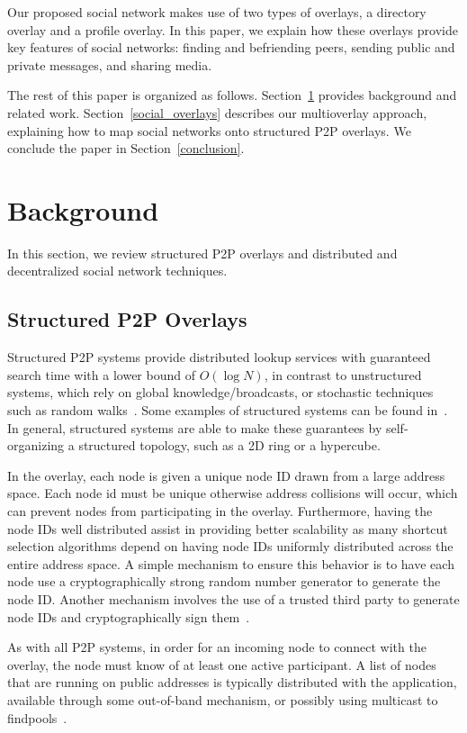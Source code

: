 \documentclass[letterpaper,twocolumn,10pt]{article}
\begin{document}
Our proposed social network makes use of two types of overlays, a directory
overlay and a profile overlay.  In this paper, we explain how these overlays
provide key features of social networks:  finding and befriending peers,
sending public and private messages, and sharing media.

The rest of this paper is organized as follows.  Section~\ref{background}
provides background and related work.  Section~\ref{social_overlays} describes
our multioverlay approach, explaining how to map social networks onto structured
P2P overlays.  We conclude the paper in Section~\ref{conclusion}.

\section{Background}
\label{background}
In this section, we review structured P2P overlays and distributed and
decentralized social network techniques.
\subsection{Structured P2P Overlays}
Structured P2P systems provide distributed lookup services with guaranteed
search time with a lower bound of $O(\log N)$, in contrast to unstructured
systems, which rely on global knowledge/broadcasts, or stochastic techniques
such as random walks~\cite{unstructured_v_structured}.  Some examples of
structured systems can be found in~\cite{pastry, chord, symphony, kademlia,
can}.  In general, structured systems are able to make these guarantees by
self-organizing a structured topology, such as a 2D ring or a hypercube.

In the overlay, each node is given a unique node ID drawn from a large address
space.  Each node id must be unique otherwise address collisions will occur,
which can prevent nodes from participating in the overlay.  Furthermore, having
the node IDs well distributed assist in providing better scalability as many
shortcut selection algorithms depend on having node IDs uniformly distributed
across the entire address space.  A simple mechanism to ensure this behavior is
to have each node use a cryptographically strong random number generator to
generate the node ID.  Another mechanism involves the use of a trusted third
party to generate node IDs and cryptographically sign them~\cite{secure_routing}.

As with all P2P systems, in order for an incoming node to connect with
the overlay, the node must know of at least one active participant.  A list of
nodes that are running on public addresses is typically distributed with the
application, available through some out-of-band mechanism, or possibly using
multicast to findpools~\cite{pastry}.
\end{document}
